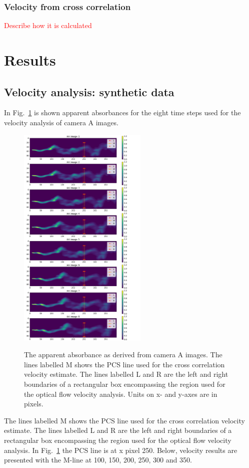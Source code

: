 \documentclass[amtd, manuscript]{copernicus}
\begin{document}
\subsubsection{Velocity from cross correlation}
\textcolor{red}{Describe how it is calculated}


\section{Results}
\subsection{Velocity analysis: synthetic data}
In Fig.~\ref{fig:Fig_Image_LocA} is shown apparent absorbances for the
eight time steps used for the velocity analysis of camera A images.
\begin{figure}[!htb]
  \begin{center}
    \includegraphics[width=0.55\textwidth]{Fig_Image_LocA.png}\\
    \caption{\label{fig:Fig_Image_LocA}
      The apparent absorbance as derived from  camera A images.
      The lines labelled M shows the PCS line used for the cross correlation
      velocity estimate. The lines labelled L and R are the left  and right
      boundaries of a rectangular box encompassing the  region used for the
      optical flow velocity analysis.
      Units on x- and y-axes are in pixels.
    }
  \end{center}
\end{figure}
The lines labelled M shows the PCS line used for the cross correlation
velocity estimate. The lines labelled L and R are the left  and right
boundaries of a rectangular box encompassing the  region used for the
optical flow velocity analysis. In Fig.~\ref{fig:Fig_Image_LocA} the
PCS line is at x pixel 250. Below, velocity results are presented with
the M-line at 100, 150, 200, 250, 300 and 350.
\end{document}
